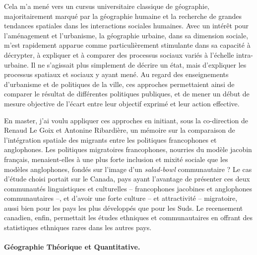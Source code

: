 Cela m'a mené vers un cursus universitaire classique de géographie, majoritairement marqué par la géographie humaine et la recherche de grandes tendances spatiales dans les interactions sociales humaines.
Avec un intérêt pour l'aménagement et l'urbanisme, la géographie urbaine, dans sa dimension sociale, m'est rapidement apparue comme particulièrement stimulante dans sa capacité à décrypter, à expliquer et à comparer des processus sociaux variés à l'échelle intra-urbaine.
Il ne s'agissait plus simplement de décrire un état, mais d'expliquer les processus spatiaux et sociaux y ayant mené.
Au regard des enseignements d'urbanisme et de politiques de la ville, ces approches permettaient ainsi de comparer le résultat de différentes politiques publiques, et de mener un début de mesure objective de l'écart entre leur objectif exprimé et leur action effective.

En master, j'ai voulu appliquer ces approches en initiant, sous la co-direction de Renaud Le Goix et Antonine Ribardière, un mémoire sur la comparaison de l'intégration spatiale des migrants entre les politiques francophones et anglophones.
Les politiques migratoires francophones, nourries du modèle jacobin français, menaient-elles à une plus forte inclusion et mixité sociale que les modèles anglophones, fondés sur l'image d'un \og \textit{salad-bowl}\fg{} communautaire ?
Le cas d'étude choisi portait sur le Canada, pays ayant l'avantage de présenter ces deux communautés linguistiques et culturelles -- francophones jacobines et anglophones communautaires --, et d'avoir une forte culture -- et attractivité -- migratoire, aussi bien pour les pays les plus développés que pour les Suds.
Le recensement canadien, enfin, permettait les études ethniques et communautaires en offrant des statistiques ethniques rares dans les autres pays.

\paragraph{Géographie Théorique et Quantitative.}

